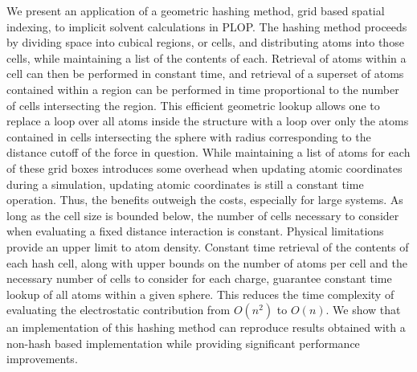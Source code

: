 We present an application of a geometric hashing method, grid based spatial indexing, to implicit solvent calculations in PLOP.
The hashing method proceeds by dividing space into cubical regions, or cells, and distributing atoms into those cells, while maintaining a list of the contents of each.
Retrieval of atoms within a cell can then be performed in constant time, and retrieval of a superset of atoms contained within a region can be performed in time proportional to the number of cells intersecting the region.
This efficient geometric lookup allows one to replace a loop over all atoms inside the structure with a loop over only the atoms contained in cells intersecting the sphere with radius corresponding to the distance cutoff of the force in question.
While maintaining a list of atoms for each of these grid boxes introduces some overhead when updating atomic coordinates during a simulation, updating atomic coordinates is still a constant time operation.
Thus, the benefits outweigh the costs, especially for large systems.
As long as the cell size is bounded below, the number of cells necessary to consider when evaluating a fixed distance interaction is constant.
Physical limitations provide an upper limit to atom density.
Constant time retrieval of the contents of each hash cell, along with upper bounds on the number of atoms per cell and the necessary number of cells to consider for each charge, guarantee constant time lookup of all atoms within a given sphere.
This reduces the time complexity of evaluating the electrostatic contribution from $O(n^2)$ to $O(n)$.
We show that an implementation of this hashing method can reproduce results obtained with a non-hash based implementation while providing significant performance improvements.

